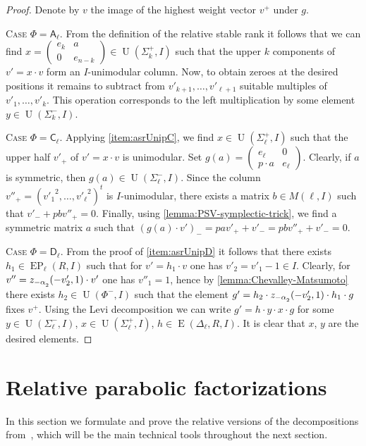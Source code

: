 \documentclass[oneside, 12pt]{amsart}
\theoremstyle{plain}
\numberwithin{equation}{section}
\numberwithin{lemma}{section}
\theoremstyle{definition}
\theoremstyle{remark}
\DeclareMathOperator{\E}{E}
\DeclareMathOperator{\EP}{EP}
\DeclareMathOperator{\U}{U}
\newcommand{\rA}{\mathsf{A}}
\newcommand{\rC}{\mathsf{C}}
\newcommand{\rD}{\mathsf{D}}
\def\ssub#1{\mathchoice
   {_{\lower2pt\hbox{$\scriptstyle #1$}}}
   {_{\lower2pt\hbox{$\scriptstyle #1$}}}
   {_{\lower1.5pt\hbox{$\scriptscriptstyle #1$}}}
   {_{\!\lower1.5pt\hbox{$\scriptscriptstyle #1$}}}}
\begin{document}
\begin{proof} Denote by $v$ the image of the highest weight vector $v^+$ under $g$.

\textsc{Case $\Phi=\rA_\ell$.} From the definition of the relative stable rank it follows that we can find 
$x= \left(\begin{smallmatrix} e_k & a \\ 0 & e_{n-k} \end{smallmatrix}\right) \in \U(\Sigma_k^+, I)$ such that 
the upper $k$ components of $v'= x \cdot v$ form an $I$-unimodular column. 
Now, to obtain zeroes at the desired positions it remains to subtract from $v'_{k+1},\ldots, v'_{\ell+1}$ suitable multiples of $v'_1, \ldots, v'_k$.
This operation corresponds to the left multiplication by some element $y\in\U(\Sigma_k^-, I)$.

\textsc{Case $\Phi=\rC_\ell$.} 
Applying \cref{item:asrUnipC}, we find $x \in \U(\Sigma_\ell^+, I)$ such that the upper half $v'_+$ of $v' = x \cdot v$ is unimodular.
Set $g(a) = \left(\begin{smallmatrix} e_\ell & 0 \\ p \cdot a & e_{\ell} \end{smallmatrix}\right)$.
Clearly, if $a$ is symmetric, then $g(a) \in \U(\Sigma_\ell^-, I)$.
Since the column $v''_+ = ({v'_1}^2, \ldots, {v'_\ell}^2)^t$ is $I$-unimodular, there exists a matrix $b \in M(\ell, I)$ such that $v'_- + p b v''_+ = 0$.
Finally, using \cref{lemma:PSV-symplectic-trick}, we find a symmetric matrix $a$ such that $(g(a) \cdot v')_- = p a v'_+ + v'_- = p b v''_+ + v'_- = 0$.

\textsc{Case $\Phi=\rD_\ell$.} From the proof of \cref{item:asrUnipD} it follows that there exists $h_1 \in \EP_\ell(R, I)$ such that for $v'=h_1\cdot v$ one has $v'_2=v'_1-1\in I$.
Clearly, for $v'' = z_{-\alpha\ssub{2}}(-v'_2, 1)\cdot v'$ one has $v''_1=1$, hence by \cref{lemma:Chevalley-Matsumoto} there exists $h_2 \in \U(\Phi^-, I)$ such that the element
$g'=h_2 \cdot z_{-\alpha\ssub{2}}(-v'_2, 1) \cdot h_1 \cdot g$ fixes $v^+$. 
Using the Levi decomposition we can write $g'=h \cdot y \cdot x \cdot g$ for some $y\in\U(\Sigma^-_\ell, I)$, $x \in \U(\Sigma^+_\ell, I)$, $h\in\E(\Delta_\ell, R, I)$.
It is clear that $x$, $y$ are the desired elements.
\end{proof}

\section{Relative parabolic factorizations} \label{sec:factorizations}
In this section we formulate and prove the relative versions of the decompositions from~\cite{St78}, which will be the main technical tools throughout the next section.
\end{document}
